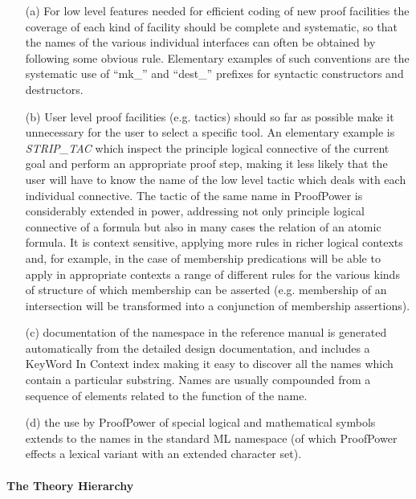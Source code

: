 \documentclass[10pt,titlepage]{book}
\def\Product{ProofPower}
\begin{document}
\begin{itemize}

\item[(a)] For low level features needed for efficient coding of new proof facilities the coverage of each kind of facility should be complete and systematic, so that the names of the various individual interfaces can often be obtained by following some obvious rule.
Elementary examples of such conventions are the systematic use of ``mk\_'' and ``dest\_'' prefixes for syntactic constructors and destructors.

\item[(b)] User level proof facilities (e.g. tactics) should so far as possible make it unnecessary for the user to select a specific tool.
An elementary example is {\it STRIP\_TAC} which inspect the principle logical connective of the current goal and perform an appropriate proof step, making it less likely that the user will have to know the name of the low level tactic which deals with each individual connective.
The tactic of the same name in {\Product} is considerably extended in power, addressing not only principle logical connective of a formula but also in many cases the relation of an atomic formula.
It is context sensitive, applying more rules in richer logical contexts and, for example, in the case of membership predications will be able to apply in appropriate contexts a range of different rules for the various kinds of structure of which membership can be asserted (e.g. membership of an intersection will be transformed into a conjunction of membership assertions).

\item[(c)] documentation of the namespace in the reference manual is generated automatically from the detailed design documentation, and includes a KeyWord In Context index making it easy to discover all the names which contain a particular substring.
Names are usually compounded from a sequence of elements related to the function of the name.

\item[(d)] the use by {\Product} of special logical and mathematical symbols extends to the names in the standard ML namespace (of which {\Product} effects a lexical variant with an extended character set).

\end{itemize}

\paragraph{The Theory Hierarchy}
\end{document}
